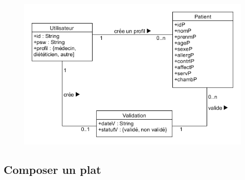 \documentclass{beamer}
\begin{document}
\begin{frame}[plain]{}
\begin{figure}
\centering
\includegraphics[scale=0.5]{../CasDUtilisations/ProfilPatient/diagclassProfilPatient.png}
\end{figure}
\end{frame}

\subsection{Composer un plat}
\end{document}
